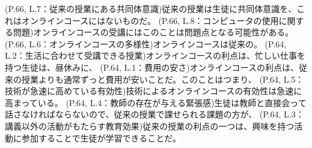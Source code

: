 \documentclass[uplatex,dvipdfmx,a4paper,10pt,oneside,openany]{jsarticle}
\begin{document}
\pagestyle{fancy}
\fancyfoot[L]{\thepage}
\fancyfoot[R]{\today}
(P.66, L.7：従来の授業にある共同体意識)従来の授業は生徒に共同体意識を、これはオンラインコースにはないものだ。
\vfill
(P.66, L.8：コンピュータの使用に関する問題)オンラインコースの受講にはこのことは問題点となる可能性がある。
\vfill
(P.66, L.6：オンラインコースの多様性)オンラインコースは従来の。
\vfill
(P.64, L.2：生活に合わせて受講できる授業)オンラインコースの利点は、忙しい仕事を持つ生徒は、昼休みに、
\vfill
(P.64, L.1：費用の安さ)オンラインコースの利点は、従来の授業よりも通常ずっと費用が安いことだ。このことはつまり、
\vfill
\newpage
(P.64, L.5：技術が急速に高めている有効性)技術によるオンラインコースの有効性は急速に高まっている。
\vfill
(P.64, L.4：教師の存在が与える緊張感)生徒は教師と直接会って話さなければならないので、従来の授業で課せられる課題の方が、
\vfill
(P.64, L.3：講義以外の活動がもたらす教育効果)従来の授業の利点の一つは、興味を持つ活動に参加することで生徒が学習できることだ。
\vfill
\end{document}
